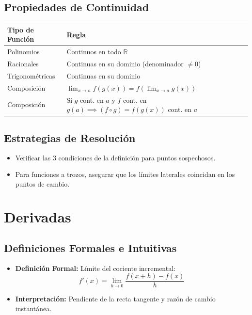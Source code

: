 \documentclass[a4paper,12pt]{article}
\theoremstyle{definition}
\begin{document}
\subsection{Propiedades de Continuidad}
\begin{table}[h!]
    \centering
    \renewcommand{\arraystretch}{1.2}
    \begin{tabular}{l l}
        \toprule
        \textbf{Tipo de Función} & \textbf{Regla} \\
        \midrule
        Polinomios & Continuos en todo $\mathbb{R}$ \\
        Racionales & Continuas en su dominio (denominador $\neq 0$) \\
        Trigonométricas & Continuas en su dominio \\
        Composición & $\lim_{x \to a} f(g(x)) = f(\lim_{x \to a} g(x))$ \\
        Composición & Si $g$ cont. en $a$ y $f$ cont. en $g(a) \implies (f \circ g) = f(g(x))$ cont. en $a$ \\
        \bottomrule
    \end{tabular}
\end{table}

\subsection{Estrategias de Resolución}
\begin{itemize}
    \item Verificar las 3 condiciones de la definición para puntos sospechosos.
    \item Para funciones a trozos, asegurar que los límites laterales coincidan en los puntos de cambio.
\end{itemize}

\newpage

\section{Derivadas}

\subsection{Definiciones Formales e Intuitivas}
\begin{itemize}
    \item \textbf{Definición Formal:} Límite del cociente incremental:
    \[ f'(x) = \lim_{h \to 0} \frac{f(x+h) - f(x)}{h} \]
    \item \textbf{Interpretación:} Pendiente de la recta tangente y razón de cambio instantánea.
\end{itemize}
\end{document}

